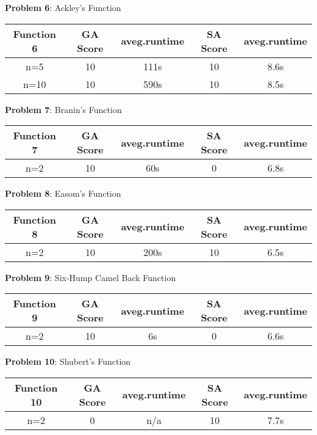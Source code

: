 \documentclass{article}
\begin{document}
\textbf{Problem 6}: Ackley's Function\\
\begin{center}
\begin{tabular}{ |c|c|c|c|c| } 
\hline
Function 6 & GA Score & aveg.runtime & SA Score & aveg.runtime \\
\hline
\multirow{1}{3em}{n=5}
& 10 & 111s & 10 & 8.6s \\ 
\hline
\multirow{1}{3em}{n=10}
& 10 & 590s & 10 & 8.5s \\ 
\hline
\end{tabular}
\end{center}

\textbf{Problem 7}: Branin's Function\\
\begin{center}
\begin{tabular}{ |c|c|c|c|c| } 
\hline
Function 7 & GA Score & aveg.runtime & SA Score & aveg.runtime \\
\hline
\multirow{1}{3em}{n=2}
& 10 & 60s & 0 & 6.8s \\ 
\hline
\end{tabular}
\end{center}

\textbf{Problem 8}: Easom's Function\\
\begin{center}
\begin{tabular}{ |c|c|c|c|c| } 
\hline
Function 8 & GA Score & aveg.runtime & SA Score & aveg.runtime \\
\hline
\multirow{1}{3em}{n=2}
& 10 & 200s & 10 & 6.5s \\ 
\hline
\end{tabular}
\end{center}

\textbf{Problem 9}: Six-Hump Camel Back Function\\
\begin{center}
\begin{tabular}{ |c|c|c|c|c| } 
\hline
Function 9 & GA Score & aveg.runtime & SA Score & aveg.runtime \\
\hline
\multirow{1}{3em}{n=2}
& 10 & 6s & 0 & 6.6s \\ 
\hline
\end{tabular}
\end{center}

\textbf{Problem 10}: Shubert's Function\\
\begin{center}
\begin{tabular}{ |c|c|c|c|c| } 
\hline
Function 10 & GA Score & aveg.runtime & SA Score & aveg.runtime \\
\hline
\multirow{1}{3em}{n=2}
& 0 & n/a & 10 & 7.7s \\ 
\hline
\end{tabular}
\end{center}
\end{document}
